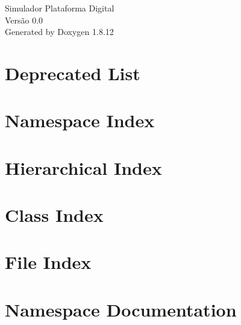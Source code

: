 \documentclass[twoside]{book}
\newcommand{\+}{\discretionary{\mbox{\scriptsize$\hookleftarrow$}}{}{}}
\newcommand{\clearemptydoublepage}{%
  \newpage{\pagestyle{empty}\cleardoublepage}%
}
\begin{document}
\hypersetup{pageanchor=false,
             bookmarksnumbered=true,
             pdfencoding=unicode
            }
\begin{titlepage}
\vspace*{7cm}
\begin{center}%
{\Large Simulador Plataforma Digital \\[1ex]\large Versão 0.\+0 }\\
\vspace*{1cm}
{\large Generated by Doxygen 1.8.12}\\
\end{center}
\end{titlepage}
\clearemptydoublepage
{}
\tableofcontents
\clearemptydoublepage
{}
\hypersetup{pageanchor=true}

\chapter{Deprecated List}
\label{deprecated}
\hypertarget{deprecated}{}

\chapter{Namespace Index}

\chapter{Hierarchical Index}

\chapter{Class Index}

\chapter{File Index}

\chapter{Namespace Documentation}


\end{document}
